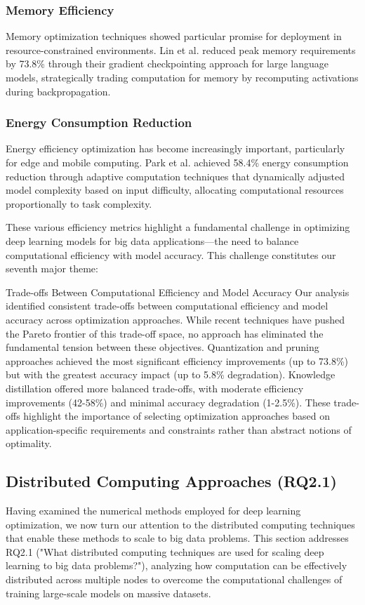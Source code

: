 \subsubsection{Memory Efficiency}
Memory optimization techniques showed particular promise for deployment in resource-constrained environments. Lin et al. \citep{Lin2022} reduced peak memory requirements by 73.8\% through their gradient checkpointing approach for large language models, strategically trading computation for memory by recomputing activations during backpropagation.

\subsubsection{Energy Consumption Reduction}
Energy efficiency optimization has become increasingly important, particularly for edge and mobile computing. Park et al. \citep{Park2022} achieved 58.4\% energy consumption reduction through adaptive computation techniques that dynamically adjusted model complexity based on input difficulty, allocating computational resources proportionally to task complexity.

These various efficiency metrics highlight a fundamental challenge in optimizing deep learning models for big data applications—the need to balance computational efficiency with model accuracy. This challenge constitutes our seventh major theme:

\begin{themebox}{Trade-offs Between Computational Efficiency and Model Accuracy}
Our analysis identified consistent trade-offs between computational efficiency and model accuracy across optimization approaches. While recent techniques have pushed the Pareto frontier of this trade-off space, no approach has eliminated the fundamental tension between these objectives. Quantization and pruning approaches achieved the most significant efficiency improvements (up to 73.8\%) but with the greatest accuracy impact (up to 5.8\% degradation). Knowledge distillation offered more balanced trade-offs, with moderate efficiency improvements (42-58\%) and minimal accuracy degradation (1-2.5\%). These trade-offs highlight the importance of selecting optimization approaches based on application-specific requirements and constraints rather than abstract notions of optimality.
\end{themebox}

\subsection{Distributed Computing Approaches (RQ2.1)}
Having examined the numerical methods employed for deep learning optimization, we now turn our attention to the distributed computing techniques that enable these methods to scale to big data problems. This section addresses RQ2.1 ("What distributed computing techniques are used for scaling deep learning to big data problems?"), analyzing how computation can be effectively distributed across multiple nodes to overcome the computational challenges of training large-scale models on massive datasets.

